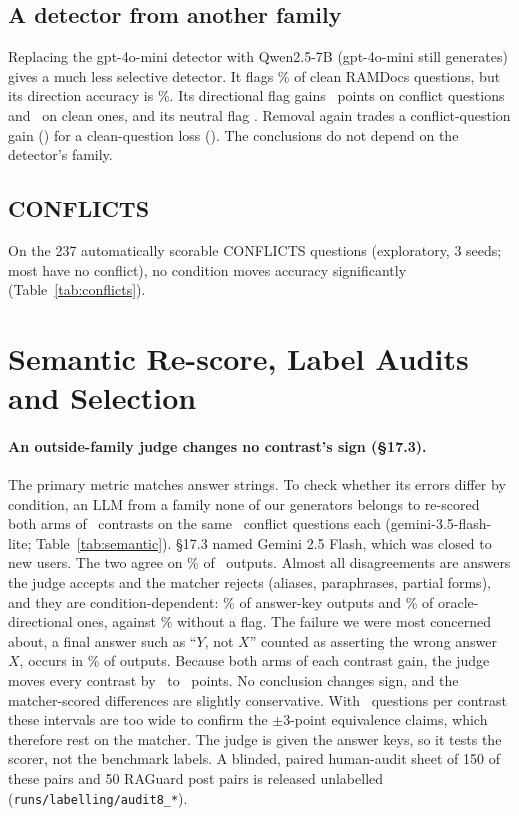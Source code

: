 \subsection{A detector from another family}
Replacing the gpt-4o-mini detector with Qwen2.5-7B (gpt-4o-mini still generates) gives a much less selective
detector. It flags \qdetFpr\% of clean RAMDocs questions, but its direction accuracy is \qdetDir\%. Its directional
flag gains \zQDetLlmDirFlagDirectionalConflict\ points on conflict questions and \zQDetLlmDirFlagDirectionalClean\ on
clean ones, and its neutral flag \zQDetLlmDirFlagConflict. Removal again trades a conflict-question gain
(\zQDetLlmDirRemoveSuspectConflict) for a clean-question loss (\zQDetLlmDirRemoveSuspectClean). The conclusions do
not depend on the detector's family.

\subsection{CONFLICTS}
On the 237 automatically scorable CONFLICTS questions (exploratory, 3 seeds; most have no conflict), no condition
moves accuracy significantly (Table~\ref{tab:conflicts}).

\section{Semantic Re-score, Label Audits and Selection}
\label{app:semantic}

\paragraph{An outside-family judge changes no contrast's sign (\S17.3).} The primary metric matches answer strings. To
check whether its errors differ by condition, an LLM from a family none of our generators belongs to re-scored both
arms of \semK\ contrasts on the same \semNq\ conflict questions each (gemini-3.5-flash-lite; Table~\ref{tab:semantic}).
\S17.3 named Gemini 2.5 Flash, which was closed to new users. The two agree on \semAgree\% of \semN\ outputs. Almost all
disagreements are answers the judge accepts and the matcher rejects (aliases, paraphrases, partial forms), and they
are condition-dependent: \semJudgeOnlyKey\% of answer-key outputs and \semJudgeOnlyDir\% of oracle-directional ones,
against \semJudgeOnlyPlain\% without a flag. The failure we were most concerned about, a final answer such as
``$Y$, not $X$'' counted as asserting the wrong answer $X$, occurs in \semRejected\% of outputs. Because
both arms of each contrast gain, the judge moves every contrast by \semDidMin\ to \semDidMax\ points. No conclusion
changes sign, and the matcher-scored differences are slightly conservative. With \semNq\ questions per contrast these
intervals are too wide to confirm the $\pm$3-point equivalence claims, which therefore rest on the matcher. The
judge is given the answer keys, so it tests the scorer, not the benchmark labels. A blinded, paired human-audit sheet of
150 of these pairs and 50 RAGuard post pairs is released unlabelled (\texttt{runs/labelling/audit8\_*}).

